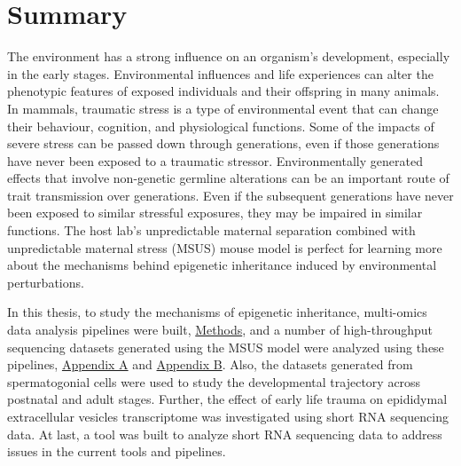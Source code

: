 \documentclass[12pt,twoside]{reedthesis}
\begin{document}
\hypertarget{summary}{%
\chapter*{Summary}\label{summary}}

The environment has a strong influence on an organism's development, especially in the early stages. Environmental influences and life experiences can alter the phenotypic features of exposed individuals and their offspring in many animals. In mammals, traumatic stress is a type of environmental event that can change their behaviour, cognition, and physiological functions. Some of the impacts of severe stress can be passed down through generations, even if those generations have never been exposed to a traumatic stressor. Environmentally generated effects that involve non-genetic germline alterations can be an important route of trait transmission over generations. Even if the subsequent generations have never been exposed to similar stressful exposures, they may be impaired in similar functions. The host lab's unpredictable maternal separation combined with unpredictable maternal stress (MSUS) mouse model is perfect for learning more about the mechanisms behind epigenetic inheritance induced by environmental perturbations.

In this thesis, to study the mechanisms of epigenetic inheritance, multi-omics data analysis pipelines were built, \protect\hyperlink{methods}{Methods}, and a number of high-throughput sequencing datasets generated using the MSUS model were analyzed using these pipelines, \protect\hyperlink{aa}{Appendix A} and \protect\hyperlink{ab}{Appendix B}. Also, the datasets generated from spermatogonial cells were used to study the developmental trajectory across postnatal and adult stages. Further, the effect of early life trauma on epididymal extracellular vesicles transcriptome was investigated using short RNA sequencing data. At last, a tool was built to analyze short RNA sequencing data to address issues in the current tools and pipelines.
\end{document}
